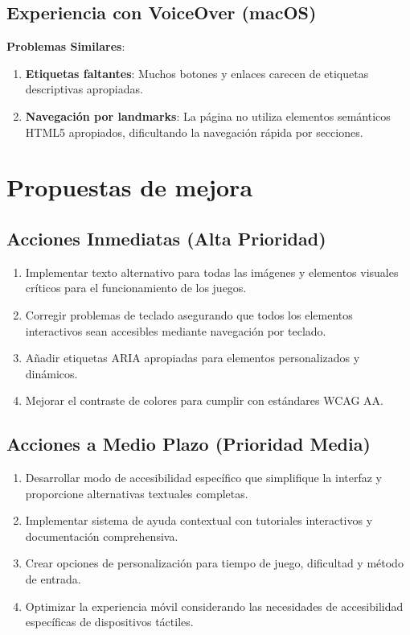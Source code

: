 \documentclass{article}
\begin{document}
	\subsection{Experiencia con VoiceOver (macOS)}
	
	\noindent
	\textbf{Problemas Similares}:
	\begin{enumerate}
		\item \textbf{Etiquetas faltantes}: Muchos botones y enlaces carecen de etiquetas descriptivas apropiadas.
		\item \textbf{Navegación por landmarks}: La página no utiliza elementos semánticos HTML5 apropiados, dificultando la navegación rápida por secciones.
	\end{enumerate}

	
	\section{Propuestas de mejora}

	\subsection{Acciones Inmediatas (Alta Prioridad)}
	\noindent
	\begin{enumerate}
		\item Implementar texto alternativo para todas las imágenes y elementos visuales críticos para el funcionamiento de los juegos.
		\item Corregir problemas de teclado asegurando que todos los elementos interactivos sean accesibles mediante navegación por teclado.
		\item Añadir etiquetas ARIA apropiadas para elementos personalizados y dinámicos.
		\item Mejorar el contraste de colores para cumplir con estándares WCAG AA.
	\end{enumerate}

	\subsection{Acciones a Medio Plazo (Prioridad Media)}
	\noindent
	\begin{enumerate}
		\item Desarrollar modo de accesibilidad específico que simplifique la interfaz y proporcione alternativas textuales completas.
		\item Implementar sistema de ayuda contextual con tutoriales interactivos y documentación comprehensiva.
		\item Crear opciones de personalización para tiempo de juego, dificultad y método de entrada.
		\item Optimizar la experiencia móvil considerando las necesidades de accesibilidad específicas de dispositivos táctiles.
	\end{enumerate}
\end{document}
